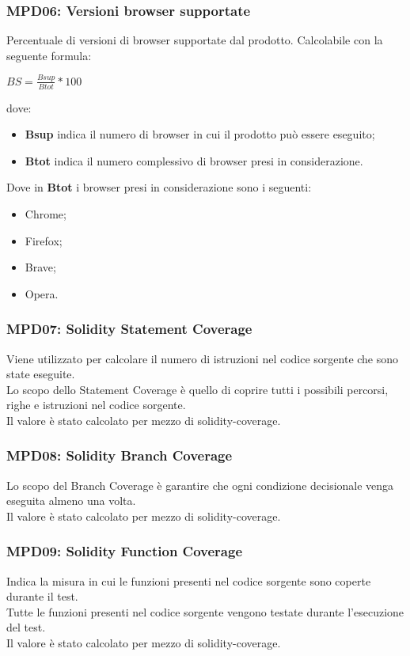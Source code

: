 \subsubsection{MPD06: Versioni browser supportate}\label{sssec:versioni_browser_supportate}
Percentuale di versioni di browser supportate dal prodotto.
Calcolabile con la seguente formula:
\begin{center}
    $BS = \displaystyle \frac{Bsup}{Btot}*100$
\end{center}
dove:
\begin{itemize}
    \item \textbf{Bsup} indica il numero di browser in cui il prodotto può essere eseguito;
    \item \textbf{Btot} indica il numero complessivo di browser presi in considerazione.
\end{itemize}
Dove in \textbf{Btot} i browser presi in considerazione sono i seguenti:
\begin{itemize}
    \item Chrome;
    \item Firefox;
    \item Brave;
    \item Opera.
\end {itemize} 

\subsubsection{MPD07: Solidity Statement Coverage}\label{sssec:solidity_statement_coverage}
Viene utilizzato per calcolare il numero di istruzioni nel codice sorgente che sono state eseguite.\\
Lo scopo dello Statement Coverage è quello di coprire tutti i possibili percorsi, righe e istruzioni nel codice sorgente.\\
Il valore è stato calcolato per mezzo di solidity-coverage.

\subsubsection{MPD08: Solidity Branch Coverage}\label{sssec:solidity_branch_coverage}
Lo scopo del Branch Coverage è garantire che ogni condizione decisionale venga eseguita almeno una volta.\\
Il valore è stato calcolato per mezzo di solidity-coverage.

\subsubsection{MPD09: Solidity Function Coverage}\label{sssec:solidity_function_coverage}
Indica la misura in cui le funzioni presenti nel codice sorgente sono coperte durante il test.\\
Tutte le funzioni presenti nel codice sorgente vengono testate durante l'esecuzione del test.\\
Il valore è stato calcolato per mezzo di solidity-coverage.

